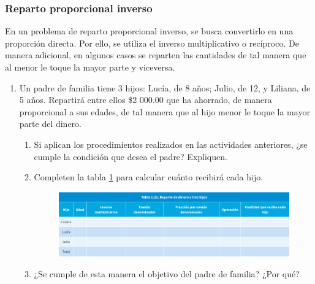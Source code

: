 \documentclass[11pt]{book}
\begin{document}
\subsubsection{Reparto proporcional inverso}
En un problema de reparto proporcional inverso, se busca convertirlo en una proporción directa. Por ello, se utiliza el inverso multiplicativo o recíproco.
De manera adicional, en algunos casos se reparten las cantidades de tal manera que al menor le toque la mayor parte y viceversa.
\begin{enumerate}
  \item Un padre de familia tiene 3 hijos: Lucía, de 8 años; Julio, de 12, y Liliana, de 5 años. Repartirá entre ellos \$2 000.00 que ha ahorrado, de manera proporcional a sus edades, de tal manera que al hijo menor le toque la mayor parte del dinero.
        \begin{enumerate}
          \item Si aplican los procedimientos realizados en las actividades anteriores, ¿se cumple la condición que desea el padre? Expliquen.
          \item Completen la tabla \ref{tab:reparto_hijos} para calcular cuánto recibirá cada hijo.
                \begin{figure}[H]
                  \centering
                  \includegraphics[width=\textwidth]{reparto_hijos}
                  \label{tab:reparto_hijos}
                \end{figure}
          \item ¿Se cumple de esta manera el objetivo del padre de familia? ¿Por qué?
        \end{enumerate}


\end{enumerate}
\end{document}
